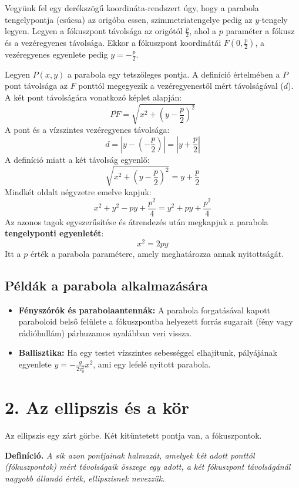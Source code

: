\documentclass[12pt, a4paper]{article}
\newcommand{\textbfr}[1]{\textbf{\textcolor{bvred}{#1}}}
\begin{document}
Vegyünk fel egy derékszögű koordináta-rendszert úgy, hogy a parabola tengelypontja (csúcsa) az origóba essen, szimmetriatengelye pedig az $y$-tengely legyen. Legyen a fókuszpont távolsága az origótól $\frac{p}{2}$, ahol a $p$ paraméter a fókusz és a vezéregyenes távolsága. Ekkor a fókuszpont koordinátái $F\left(0, \frac{p}{2}\right)$, a vezéregyenes egyenlete pedig $y = -\frac{p}{2}$.

Legyen $P(x,y)$ a parabola egy tetszőleges pontja. A definíció értelmében a $P$ pont távolsága az $F$ ponttól megegyezik a vezéregyenestől mért távolságával ($d$). A két pont távolságára vonatkozó képlet alapján:
\[ \overline{PF} = \sqrt{x^2 + \left(y - \frac{p}{2}\right)^2} \]
A pont és a vízszintes vezéregyenes távolsága:
\[ d = \left| y - \left(-\frac{p}{2}\right) \right| = \left| y + \frac{p}{2} \right| \]
A definíció miatt a két távolság egyenlő:
\[ \sqrt{x^2 + \left(y - \frac{p}{2}\right)^2} = y + \frac{p}{2} \]
Mindkét oldalt négyzetre emelve kapjuk:
\[ x^2 + y^2 - py + \frac{p^2}{4} = y^2 + py + \frac{p^2}{4} \]
Az azonos tagok egyszerűsítése és átrendezés után megkapjuk a parabola \textbfr{tengelyponti egyenletét}:
\[ x^2 = 2py \]
Itt a $p$ érték a parabola paramétere, amely meghatározza annak nyitottságát.

\subsection*{Példák a parabola alkalmazására}
\begin{itemize}
    \item \textbf{Fényszórók és parabolaantennák:} A parabola forgatásával kapott paraboloid belső felülete a fókuszpontba helyezett forrás sugarait (fény vagy rádióhullám) párhuzamos nyalábban veri vissza.
    \item \textbf{Ballisztika:} Ha egy testet vízszintes sebességgel elhajítunk, pályájának egyenlete $y = -\frac{g}{2v_0^2}x^2$, ami egy lefelé nyitott parabola.
\end{itemize}

\section*{2. Az ellipszis és a kör}

Az ellipszis egy zárt görbe. Két kitüntetett pontja van, a fókuszpontok.

\textbf{Definíció.} \textit{A sík azon pontjainak halmazát, amelyek két adott ponttól (fókuszpontok) mért távolságaik összege egy adott, a két fókuszpont távolságánál nagyobb állandó érték, \textcolor{bvred}{ellipszisnek} nevezzük.}
\end{document}
